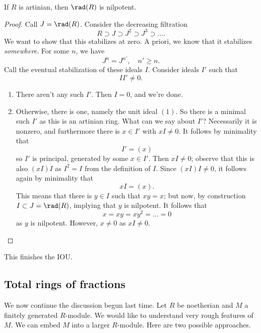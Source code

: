 \begin{lemma} 
If $R$ is artinian, then $\rad (R) $ is nilpotent.
\end{lemma} 
\begin{proof} 
Call $J = \rad(R)$. Consider the decreasing filtration
\[ R \supset J \supset J^2 \supset J^3 \supset \dots.  \]
We want to show that this stabilizes at zero. A priori, we know that it
stabilizes \emph{somewhere}. For some $n$, we have
\[ J^n = J^{n'}, \quad n' \geq n.  \]
Call the eventual stabilization of these ideals $I$. Consider ideals $I'$ such
that
\[ II' \neq 0.  \]
\begin{enumerate}
\item There aren't any such $I'$. Then $I = 0$, and we're done. 
\item Otherwise, there is one, namely the unit ideal $(1)$. So there is a
minimal such $I'$ as this is an artinian ring. What can we say about $I'$?
Necessarily it is nonzero, and furthermore there is $x \in I'$ with $x I \neq
0$. It follows by minimality that
\[ I' = (x)  \]
so $I'$ is principal, generated by some $x \in I'$. Then $xI \neq 0$; observe
that this is also $(xI)I $ as $I^2  = I$ from the definition of $I$. Since
$(xI) I \neq 0$, it follows again by minimality that
\[ xI = (x).  \] This means that there is $y \in I$ such that $xy = x$; but now, by construction $I \subset J = \rad (R)$, implying that $y $ is nilpotent.
It follows that
\[ x = xy = xy^2 = \dots = 0  \]
as $y$ is nilpotent. However, $x \neq 0$ as $xI \neq 0$. 
\end{enumerate}
\end{proof} 
This finishes the IOU.

\subsection{Total rings of fractions}

We now continue the discussion begun last time. Let $R$ be noetherian and $M$ a
finitely generated $R$-module. We would like to understand very rough features of $M$.  
We can embed $M$ into a larger $R$-module.
Here are two possible approaches.

